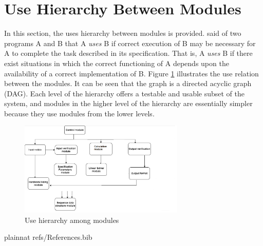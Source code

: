 \documentclass[12pt, titlepage]{article}
\begin{document}
\section{Use Hierarchy Between Modules} \label{SecUse}

In this section, the uses hierarchy between modules is
provided. \citet{Parnas1978} said of two programs A and B that A {\em uses} B if
correct execution of B may be necessary for A to complete the task described in
its specification. That is, A {\em uses} B if there exist situations in which
the correct functioning of A depends upon the availability of a correct
implementation of B.  Figure \ref{FigUH} illustrates the use relation between
the modules. It can be seen that the graph is a directed acyclic graph
(DAG). Each level of the hierarchy offers a testable and usable subset of the
system, and modules in the higher level of the hierarchy are essentially simpler
because they use modules from the lower levels.

\begin{figure}[H]
\centering
\includegraphics[width=0.7\textwidth]{mg.png}
\caption{Use hierarchy among modules}
\label{FigUH}
\end{figure}


 {plainnat}
 {refs/References.bib}

\newpage{}
\end{document}
